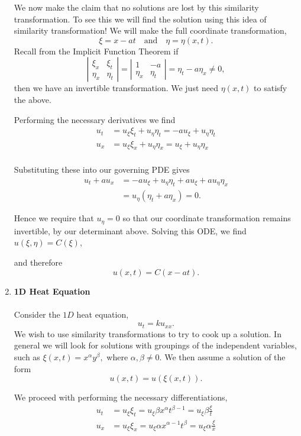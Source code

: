 \begin{enumerate}
We now make the claim that no solutions are lost by this similarity transformation. To see this we will find the solution using this idea of similarity transformation! We will make the full coordinate transformation, 
$$\xi = x-at \ \ \ \mbox{ and } \ \ \ \eta = \eta(x,t).$$
Recall from the Implicit Function Theorem if $$\left| \begin{array}{cc} \xi_x & \xi_t \\ \eta_x & \eta_t \end{array} \right| = \left| \begin{array}{cc} 1 & -a \\ \eta_x & \eta_t \end{array} \right| = \eta_t - a\eta_x \neq 0,$$ then we have an invertible transformation. We just need $\eta(x,t)$ to satisfy the above.

Performing the necessary derivatives we find
\begin{align*}
u_t &= u_\xi \xi_t + u_\eta \eta_t = -a u_\xi + u_\eta \eta_t \\
u_x &= u_\xi \xi_x + u_\eta \eta_x = u_\xi +u_\eta \eta_x \\
\end{align*}

Substituting these into our governing PDE gives
\begin{align*}
u_t + au_x &= -au_\xi + u_\eta \eta_t + au_\xi + au_\eta \eta_x \\
&= u_\eta (\eta_t + a\eta_x) =0.
\end{align*}

Hence we require that $u_\eta=0$ so that our coordinate transformation remains invertible, by our determinant above. Solving this ODE, we find $u(\xi,\eta)=C(\xi),$

and therefore $$u(x,t) = C(x-at).$$

\item {\bf{1D Heat Equation}} \\ \\

Consider the $1D$ heat equation, $$u_t =  k u_{xx}.$$ We wish to use similarity transformations to try to cook up a solution. In general we will look for solutions with groupings of the independent variables, such as $\xi(x,t) = x^\alpha y^\beta,$ where $\alpha,\beta\neq 0.$ We then assume a solution of the form $$u(x,t) = u(\xi(x,t)).$$

We proceed with performing the necessary differentiations,
\begin{align*}
u_t &= u_\xi \xi_t = u_\xi \beta x^\alpha t^{\beta-1} = u_\xi \beta \frac{\xi}{t} \\
u_x&= u_\xi \xi_x = u_\xi \alpha x^{\alpha-1} t^\beta = u_\xi \alpha \frac{\xi}{x}\\
\end{align*}


\end{enumerate}
